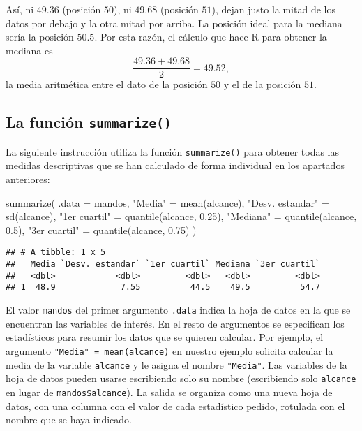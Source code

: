 \documentclass[
  degree=mecinf,
  title=normal,
  toc=normal,
  bib=normal]{mnye}
\newenvironment{Shaded}{\begin{snugshade}}{\end{snugshade}}
\newcommand{\AttributeTok}[1]{\textcolor[rgb]{0.77,0.63,0.00}{#1}}
\newcommand{\FloatTok}[1]{\textcolor[rgb]{0.00,0.00,0.81}{#1}}
\newcommand{\FunctionTok}[1]{\textcolor[rgb]{0.00,0.00,0.00}{#1}}
\newcommand{\NormalTok}[1]{#1}
\newcommand{\OtherTok}[1]{\textcolor[rgb]{0.56,0.35,0.01}{#1}}
\newcommand{\StringTok}[1]{\textcolor[rgb]{0.31,0.60,0.02}{#1}}
\begin{document}
Así, ni \(49.36\) (posición \(50\)), ni \(49.68\) (posición \(51\)), dejan justo la mitad de los datos por debajo y la otra mitad por arriba.
La posición ideal para la mediana sería la posición \(50.5\). Por esta razón, el cálculo que hace \textsf{R} para obtener la mediana es
\[
\frac{49.36+49.68}{2}=49.52,
\]
la media aritmética entre el dato de la posición \(50\) y el de la posición \(51\).

\hypertarget{summarize}{%
\subsection{\texorpdfstring{La función \texttt{summarize()}}{La función summarize()}}\label{summarize}}

La siguiente instrucción utiliza la función \texttt{summarize()} para obtener todas las medidas descriptivas que se han calculado de forma individual en los apartados anteriores:

\begin{Shaded}
\begin{Highlighting}[]
\FunctionTok{summarize}\NormalTok{(}
    \AttributeTok{.data =}\NormalTok{ mandos, }
    \StringTok{"Media"} \OtherTok{=} \FunctionTok{mean}\NormalTok{(alcance), }
    \StringTok{"Desv. estandar"} \OtherTok{=} \FunctionTok{sd}\NormalTok{(alcance),}
    \StringTok{"1er cuartil"} \OtherTok{=} \FunctionTok{quantile}\NormalTok{(alcance, }\FloatTok{0.25}\NormalTok{),}
    \StringTok{"Mediana"} \OtherTok{=} \FunctionTok{quantile}\NormalTok{(alcance, }\FloatTok{0.5}\NormalTok{),}
    \StringTok{"3er cuartil"} \OtherTok{=} \FunctionTok{quantile}\NormalTok{(alcance, }\FloatTok{0.75}\NormalTok{)}
\NormalTok{)}
\end{Highlighting}
\end{Shaded}

\begin{verbatim}
## # A tibble: 1 x 5
##   Media `Desv. estandar` `1er cuartil` Mediana `3er cuartil`
##   <dbl>            <dbl>         <dbl>   <dbl>         <dbl>
## 1  48.9             7.55          44.5    49.5          54.7
\end{verbatim}

El valor \texttt{mandos} del primer argumento \texttt{.data} indica la hoja de datos en la que se encuentran las variables de interés. En el resto de argumentos se especifican los estadísticos para resumir los datos que se quieren calcular. Por ejemplo, el argumento \texttt{"Media"\ =\ mean(alcance)} en nuestro ejemplo solicita calcular la media de la variable \texttt{alcance} y le asigna el nombre \texttt{"Media"}. Las variables de la hoja de datos pueden usarse escribiendo solo su nombre (escribiendo solo \texttt{alcance} en lugar de \texttt{mandos\$alcance}). La salida se organiza como una nueva hoja de datos, con una columna con el valor de cada estadístico pedido, rotulada con el nombre que se haya indicado.
\end{document}
